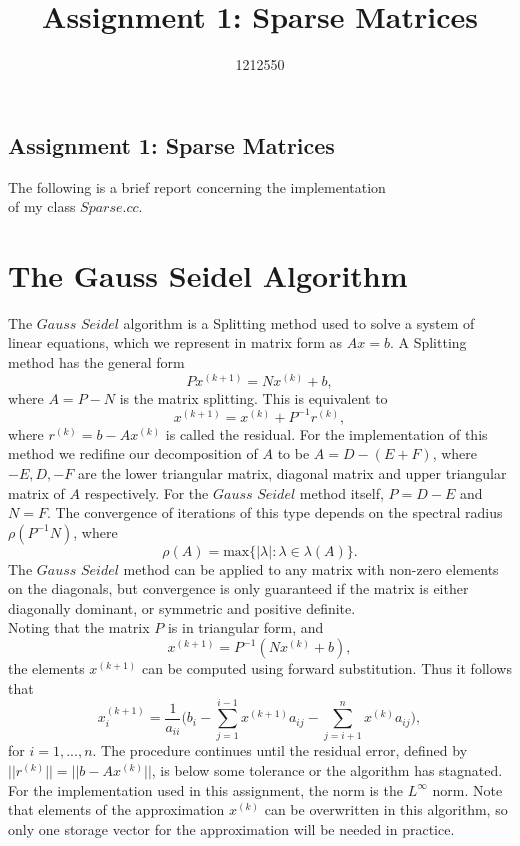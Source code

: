 \documentclass[10pt]{article}
\begin{document}
\title{Assignment 1: Sparse Matrices}
\author{1212550}
\begin{center}
\section*{Assignment 1: Sparse Matrices}


The following is a brief report concerning the implementation\\ of my class $\textit{Sparse.cc}$.\\
\end{center}

\section{The Gauss Seidel Algorithm}

The  $\textit{Gauss Seidel}$  algorithm is a Splitting method used to solve a system of linear equations, which we represent in matrix form as $Ax=b$. A Splitting method has the general form
\[ Px^{(k+1)} = Nx^{(k)} + b, \]
where $A = P - N$ is the matrix splitting. This is equivalent to
\[ x^{(k+1)} = x^{(k)} + P^{-1}r^{(k)}, \]
where $r^{(k)} = b - Ax^{(k)}$ is called the residual. For the implementation of this method we redifine our decomposition of $A$ to be $A = D - (E+F)$, where $-E,D,-F$ are the lower triangular matrix, diagonal matrix and upper triangular matrix of $A$ respectively. For the $\textit{Gauss Seidel}$ method itself, $P = D - E$ and $N = F$. The convergence of iterations of this type depends on the spectral radius $\rho(P^{-1}N)$, where
\[ \rho(A) = \text{max}\{ |\lambda|: \lambda \in \lambda(A) \}. \]
The $\textit{Gauss Seidel}$ method can be applied to any matrix with non-zero elements on the diagonals, but convergence is only guaranteed if the matrix is either diagonally dominant, or symmetric and positive definite. \\

Noting that the matrix $P$ is in triangular form, and
\[ x^{(k+1)} = P^{-1}(Nx^{(k)} + b),\]
the elements $x^{(k+1)}$ can be computed using forward substitution. Thus it follows that
\[ x_i^{(k+1)} = \frac{1}{a_{ii}} \Big( b_i - \sum_{j=1}^{i-1}x^{(k+1)}a_{ij} - \sum_{j=i+1}^{n}x^{(k)}a_{ij} \Big), \]
for $i = 1,...,n$. The procedure continues until the residual error, defined by $||r^{(k)}|| = ||b- A x^{(k)}||$, is below some tolerance or the algorithm has stagnated. For the implementation used in this assignment, the norm is the $L^{\infty}$ norm. Note that elements of the approximation $x^{(k)}$ can be overwritten in this algorithm, so only one storage vector for the approximation will be needed in practice. \\
\end{document}
